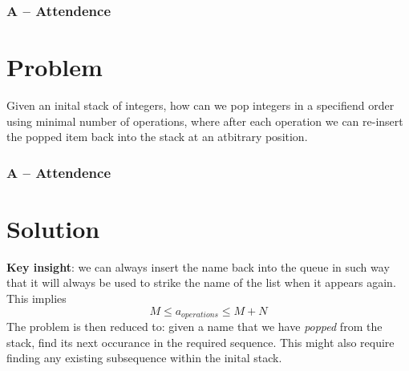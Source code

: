 \begin{frame}
  \frametitle{A -- Attendence}
  \section*{Problem}
  Given an inital stack of integers, how can we pop integers in a specifiend order using minimal number of operations, where after each operation we can re-insert the popped item back into the stack at an atbitrary position.
\end{frame}
\begin{frame}
  \frametitle{A -- Attendence}
  \section*{Solution}
  \textbf{Key insight}: we can always insert the name back into the queue in such way that it will always be used to strike the name of the list when it appears again.
  This implies $$M \leq a_{operations} \le M + N$$
  The problem is then reduced to: given a name that we have \textit{popped} from the stack, find its next occurance in the required sequence. This might also require finding any existing subsequence within the inital stack.

\end{frame}
